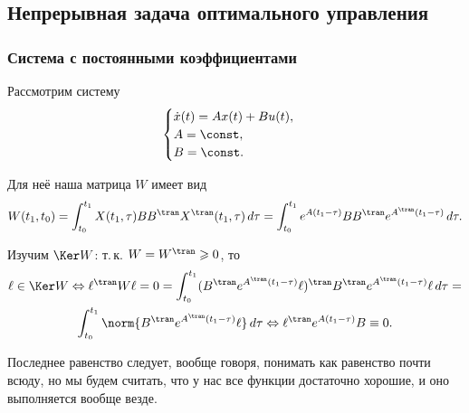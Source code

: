 {\newcommand{\rang}{\mathop{\mathrm{rang}}}




\subsection{Непрерывная задача оптимального управления}

\subsubsection{Система с постоянными коэффициентами}
Рассмотрим систему
\begin{equation}
\label{ConstKoefContSys}
  \begin{cases}
    \dot{x}(t) = A x(t) + B u(t),\\
    A = \const,\\
    B = \const.
  \end{cases}
\end{equation}

Для неё наша матрица $W$ имеет вид
\begin{equation*}
	W(t_1, t_0) = \int_{t_0}^{t_1} X(t_1, \tau) B B^\tran X^\tran(t_1, \tau) \, d\tau =
	\int_{t_0}^{t_1} e^{A(t_1 - \tau)} B B^\tran e^{A^\tran(t_1 - \tau)} \, d\tau.
\end{equation*}

Изучим $\Ker W$:
т.\,к. $W = W^\tran \geqslant 0$, то
\begin{multline*}
	\ell \in \Ker W \Leftrightarrow 
	\ell^\tran W \ell = 0 =
	\int_{t_0}^{t_1} (B^\tran e^{A^\tran(t_1 - \tau)} \ell)^\tran B^\tran e^{A^\tran(t_1 - \tau)} \ell \, d\tau =\\
	\int_{t_0}^{t_1} \norm{B^\tran e^{A^\tran(t_1 - \tau)} \ell} \, d\tau
	\Leftrightarrow \ell^\tran e^{A(t_1 - \tau)} B \equiv 0.
\end{multline*}
	
Последнее равенство следует, вообще говоря, понимать как равенство почти всюду,
но мы будем считать, что у нас все функции достаточно хорошие,
и оно выполняется вообще везде.

}
